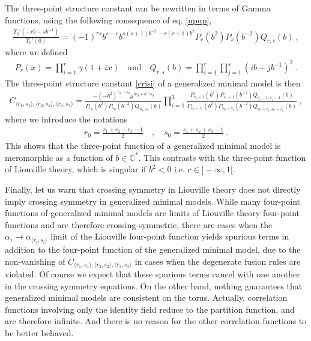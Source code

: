 \documentclass[12pt,a4paper,notitlepage]{report}
\numberwithin{equation}{section}
\theoremstyle{break}
\begin{document}
The three-point structure constant can be rewritten in terms of Gamma functions, using the following consequence of eq. \eqref{upup},
\begin{align}
 \frac{\Upsilon_b'(-rb-sb^{-1})}{\Upsilon_b'(0)} = (-1)^{rs} b^{s-r} b^{s(s+1)b^{-2}-r(r+1)b^2} P_r(b^2)P_s(b^{-2}) Q_{r,s}(b)\ ,
\end{align}
where we defined
\begin{align}
 P_r(x) = \prod_{i=1}^r \gamma(1+ix) \quad \text{and} \quad Q_{r,s}(b) = \prod_{i=1}^r \prod_{j=1}^s (ib+jb^{-1})^2\ .
\end{align}
The three-point structure constant \eqref{crisi} of a generalized minimal model is then
\begin{align}
 C_{\langle r_1,s_1\rangle ,\langle r_2,s_2\rangle ,\langle r_3,s_3 \rangle} =  \frac{-(-b^2)^{r_0-s_0}\mu^{br_0 + b^{-1}s_0}}{P_{r_0}(b^2)P_{s_0}(b^{-2})Q_{r_0,s_0}(b)} \prod_{i=1}^3 \frac{P_{r_i-1}(b^2)P_{s_i-1}(b^{-2}) Q_{r_i-1,s_i-1}(b)}{P_{r_0-r_i}(b^2)P_{s_0-s_i}(b^{-2}) Q_{r_0-r_i,s_0-s_i}(b)} \ ,
\label{cpqb}
\end{align}
where we introduce the notations 
\begin{align}
 r_0 = \frac{r_1+r_2+r_3-1}{2} \quad , \quad s_0=\frac{s_1+s_2+s_3-1}{2}\ .
\end{align}
This shows that the three-point function of a generalized minimal model is meromorphic as a function of $b\in {\mathbb{C}}^*$.
This contrasts with the three-point function of Liouville theory, which is singular if $b^2 < 0$ i.e. $c\in ]-\infty, 1[$. 

Finally, let us warn that crossing symmetry in Liouville theory does not directly imply crossing symmetry in generalized minimal models.
While many four-point functions of generalized minimal models are limits of Liouville theory four-point functions and are therefore crossing-symmetric, there are cases when the $\alpha_i\rightarrow \alpha_{\langle r_i,s_i\rangle}$ limit of the Liouville four-point function yields spurious terms in addition to the four-point function of the generalized minimal model, due to the non-vanishing of $C_{\langle r_1,s_1\rangle ,\langle r_2,s_2\rangle ,\langle r_3,s_3 \rangle}$ in cases when the degenerate fusion rules are violated.
Of course we expect that these spurious terms cancel with one another in the crossing symmetry equations. On the other hand, nothing guarantees that generalized minimal models are consistent on the torus. Actually, correlation functions involving only the identity field reduce to the partition function, and are therefore infinite. And there is no reason for the other correlation functions to be better behaved.  
\end{document}
